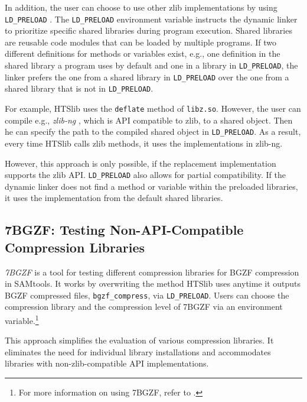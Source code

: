 In addition, the user can choose to use other zlib implementations by using \texttt{LD\_PRELOAD} \cite{myers_intercepting_nodate-1}. 
The \texttt{LD\_PRELOAD} environment variable instructs the dynamic linker to prioritize specific shared libraries during program execution. Shared libraries are reusable code modules that can be loaded by multiple programs. If two different definitions for methods or variables exist, e.g., one definition in the shared library a program uses by default and one in a library in \texttt{LD\_PRELOAD}, the linker prefers the one from a shared library in \texttt{LD\_PRELOAD} over the one from a shared library that is not in \texttt{LD\_PRELOAD}. 

For example, HTSlib uses the \texttt{deflate} method of \texttt{libz.so}. However, the user can compile e.g., \textit{zlib-ng} \cite{noauthor_zlib-ngzlib-ng_2024}, which is API compatible to zlib, to a shared object. Then he can specify the path to the compiled shared object in \texttt{LD\_PRELOAD}. As a result, every time HTSlib calls zlib methods, it uses the implementations in zlib-ng. 

However, this approach is only possible, if the replacement implementation supports the zlib API.  \texttt{LD\_PRELOAD} also allows for partial compatibility. If the dynamic linker does not find a method or variable within the preloaded libraries,  it uses the implementation from the default shared libraries.

\subsection{7BGZF: Testing Non-API-Compatible Compression Libraries}
\textit{7BGZF} \cite{yamada_7bgzf_2020} is a tool for testing different compression libraries for BGZF compression in SAMtools. It works by overwriting the method HTSlib uses anytime it outputs BGZF compressed files, \texttt{bgzf\_compress}, via \texttt{LD\_PRELOAD}. 
Users can choose the compression library and the compression level of 7BGZF via an environment variable.\footnote{For more information on using 7BGZF, refer to .}

This approach simplifies the evaluation of various compression libraries. It eliminates the need for individual library installations and accommodates libraries with non-zlib-compatible API implementations.

